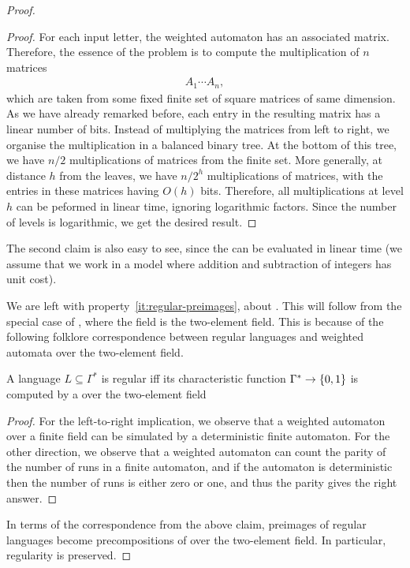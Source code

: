 \begin{proof}
\begin{proof}
        For each input letter, the weighted automaton has an associated matrix. Therefore, the essence of the  problem is to compute the multiplication of $n$ matrices 
        \begin{align*}
        A_1 \cdots A_n,
        \end{align*}
        which are taken from some fixed finite set of square matrices of same dimension. As we have already remarked before, each entry in the resulting matrix has a linear number of bits. Instead of multiplying the matrices from left to right, we organise the multiplication in a balanced binary tree. At the bottom of this tree, we have $n/2$ multiplications of matrices from the finite set. More generally, at distance $h$ from the leaves, we have $n  / 2^h$ multiplications of matrices, with the entries in these matrices having $O(h)$ bits.  Therefore, all multiplications at level $h$ can be peformed in linear time, ignoring logarithmic factors. Since the number of levels is  logarithmic, we get the desired result.
    \end{proof}
    
    The
    second claim is also easy to see, since the  can be
    evaluated in linear time (we assume that we work in a model where addition
    and subtraction of integers has unit cost). 

    We are left with property~\ref{it:regular-preimages}, about . This will follow from the special case of ,
    where the field is the two-element field.  This is because of  the
    following  folklore correspondence between regular languages and weighted
    automata over the two-element field. 
        
        \begin{claim}\label{claim:regular-weighted-automata}
            A language $L \subseteq \Gamma^*$ is regular iff its characteristic
            function $\Gamma^* \to \{0,1\}$ is computed by a  over the two-element field 
        \end{claim}
        \begin{proof}
            For the left-to-right implication, we observe that a weighted
            automaton over a finite field can be simulated by a deterministic
            finite automaton. For the other direction, we observe that a
            weighted automaton can count the parity of  the number of runs in a
            finite automaton, and if the automaton is deterministic then the
            number of runs is either zero or one, and thus the parity gives the
            right answer.
        \end{proof}

        In terms of the correspondence from the above claim, preimages of
        regular languages become precompositions of  over the
        two-element field. In particular, regularity is preserved. 
\end{proof}

